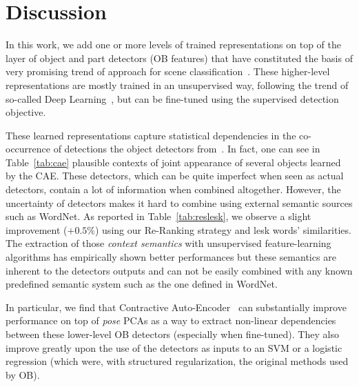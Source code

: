\documentclass[runningheads,a4paper]{llncs}
\begin{document}
%

\section{Discussion}\label{sec:disc}

In this work, we add one or more levels of trained representations on top of
the layer of object and part detectors (OB features) that have constituted the
basis of very promising trend of approach for scene
classification~\cite{LiJiaLi10}.
%
These higher-level representations are mostly trained in an unsupervised way,
following the trend of so-called Deep
Learning~\cite{Hinton06,Bengio-2009,Jarrett-ICCV2009}, but can be fine-tuned
using the supervised detection objective.
%

These learned representations capture statistical dependencies in the
co-occurrence of detections the object detectors from~\cite{LiJiaLi10}.  In
fact, one can see in Table~\ref{tab:cae} plausible contexts of joint appearance
of several objects learned by the CAE.
%
These detectors, which can be quite imperfect when seen as actual detectors,
contain a lot of information when combined altogether. However, the uncertainty
of detectors makes it hard to combine using external semantic sources such as
WordNet. As reported in Table~\ref{tab:reslesk}, we observe a slight
improvement ($+0.5\%$) using our Re-Ranking strategy and lesk words'
similarities.
%
The extraction of those {\it context semantics} with unsupervised
feature-learning algorithms has empirically shown better performances but these
semantics are inherent to the detectors outputs and can not be easily combined
with any known predefined semantic system such as the one defined in WordNet.

%

In particular, we find that Contractive
Auto-Encoder~\cite{Rifai+al-2011} can substantially improve
performance on top of \textit{pose} PCAs as a way to extract non-linear
dependencies between these lower-level OB detectors (especially when
fine-tuned). They also improve greatly upon the use of the detectors as inputs
to an SVM or a logistic regression (which were, with structured regularization,
the original methods used by OB).
%
\end{document}
